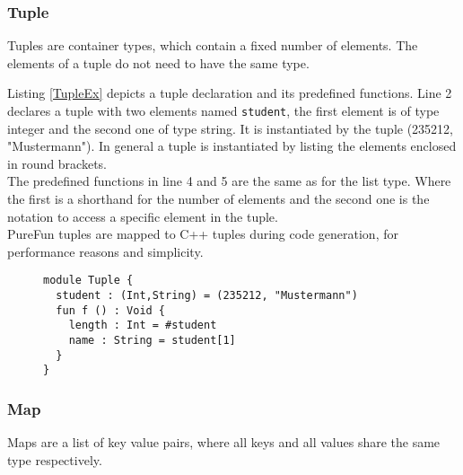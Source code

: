 \subsubsection{Tuple}
Tuples are container types, which contain a fixed number of elements. The elements of a tuple do not need to have the same type.

Listing \ref{TupleEx} depicts a tuple declaration and its predefined functions. Line 2 declares a tuple with two elements named \texttt{student}, the first element is of type integer and the second one of type string. It is instantiated by the tuple (235212, "Mustermann"). In general a tuple is instantiated by listing the elements enclosed in round brackets.\\
The predefined functions in line 4 and 5 are the same as for the list type. Where the first is a shorthand for the number of elements and the second one is the notation to access a specific element in the tuple.\\
PureFun tuples are mapped to C++ tuples during code generation, for performance reasons and simplicity.
\begin{figure}
\begin{lstlisting}[caption={PureFun code with a tuple and its predefined functions.},label={TupleEx}]
module Tuple {
  student : (Int,String) = (235212, "Mustermann")
  fun f () : Void {
    length : Int = #student
    name : String = student[1]
  }
}
\end{lstlisting}
\end{figure}
\subsubsection{Map}
Maps are a list of key value pairs, where all keys and all values share the same type respectively.

